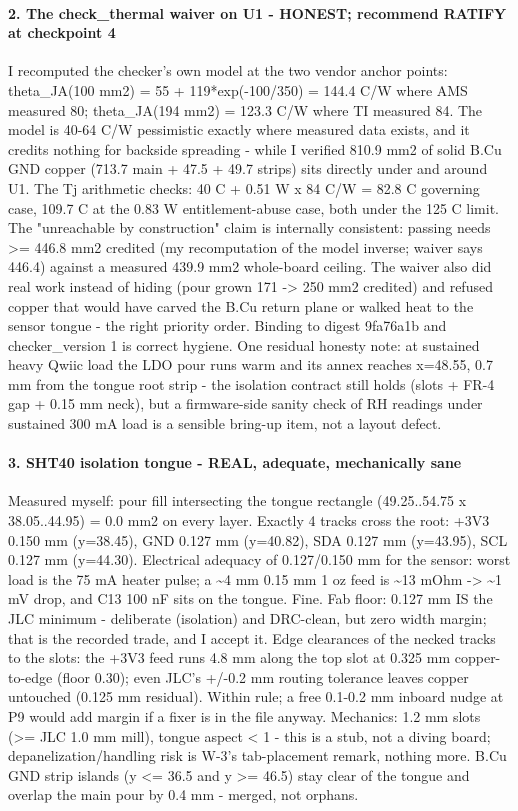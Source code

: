\documentclass[11pt,a4paper]{article}
\begin{document}
\paragraph*{2. The check\_thermal waiver on U1 - HONEST; recommend RATIFY at checkpoint 4}
I recomputed the checker's own model at the two vendor anchor points: theta\_JA(100 mm2) = 55 + 119{*}exp(-100/350) = 144.4 C/W where AMS measured 80; theta\_JA(194 mm2) = 123.3 C/W where TI measured 84. The model is 40-64 C/W pessimistic exactly where measured data exists, and it credits nothing for backside spreading - while I verified 810.9 mm2 of solid B.Cu GND copper (713.7 main + 47.5 + 49.7 strips) sits directly under and around U1. The Tj arithmetic checks: 40 C + 0.51 W x 84 C/W = 82.8 C governing case, 109.7 C at the 0.83 W entitlement-abuse case, both under the 125 C limit. The "unreachable by construction" claim is internally consistent: passing needs \textgreater{}= 446.8 mm2 credited (my recomputation of the model inverse; waiver says 446.4) against a measured 439.9 mm2 whole-board ceiling. The waiver also did real work instead of hiding (pour grown 171 -\textgreater{} 250 mm2 credited) and refused copper that would have carved the B.Cu return plane or walked heat to the sensor tongue - the right priority order. Binding to digest 9fa76a1b and checker\_version 1 is correct hygiene. One residual honesty note: at sustained heavy Qwiic load the LDO pour runs warm and its annex reaches x=48.55, 0.7 mm from the tongue root strip - the isolation contract still holds (slots + FR-4 gap + 0.15 mm neck), but a firmware-side sanity check of RH readings under sustained 300 mA load is a sensible bring-up item, not a layout defect.

\paragraph*{3. SHT40 isolation tongue - REAL, adequate, mechanically sane}
Measured myself: pour fill intersecting the tongue rectangle (49.25..54.75 x 38.05..44.95) = 0.0 mm2 on every layer. Exactly 4 tracks cross the root: +3V3 0.150 mm (y=38.45), GND 0.127 mm (y=40.82), SDA 0.127 mm (y=43.95), SCL 0.127 mm (y=44.30). Electrical adequacy of 0.127/0.150 mm for the sensor: worst load is the 75 mA heater pulse; a \textasciitilde{}4 mm 0.15 mm 1 oz feed is \textasciitilde{}13 mOhm -\textgreater{} \textasciitilde{}1 mV drop, and C13 100 nF sits on the tongue. Fine. Fab floor: 0.127 mm IS the JLC minimum - deliberate (isolation) and DRC-clean, but zero width margin; that is the recorded trade, and I accept it. Edge clearances of the necked tracks to the slots: the +3V3 feed runs 4.8 mm along the top slot at 0.325 mm copper-to-edge (floor 0.30); even JLC's +/-0.2 mm routing tolerance leaves copper untouched (0.125 mm residual). Within rule; a free 0.1-0.2 mm inboard nudge at P9 would add margin if a fixer is in the file anyway. Mechanics: 1.2 mm slots (\textgreater{}= JLC 1.0 mm mill), tongue aspect \textless{} 1 - this is a stub, not a diving board; depanelization/handling risk is W-3's tab-placement remark, nothing more. B.Cu GND strip islands (y \textless{}= 36.5 and y \textgreater{}= 46.5) stay clear of the tongue and overlap the main pour by 0.4 mm - merged, not orphans.
\end{document}
